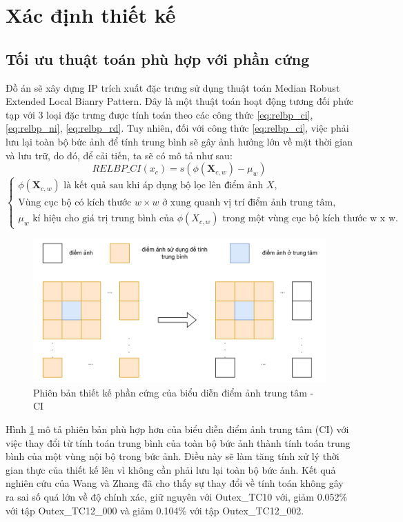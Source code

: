 \section{Xác định thiết kế}
\subsection{Tối ưu thuật toán phù hợp với phần cứng}
Đồ án sẽ xây dựng IP trích xuất đặc trưng sử dụng thuật toán Median Robust Extended Local Bianry Pattern. Đây là một thuật toán hoạt động tương đối phức tạp với 3 loại đặc trưng được tính toán theo các công thức \ref{eq:relbp_ci}, \ref{eq:relbp_ni}, \ref{eq:relbp_rd}. Tuy nhiên, đối với công thức \ref{eq:relbp_ci}, việc phải lưu lại toàn bộ bức ảnh để tính trung bình sẽ gây ảnh hưởng lớn về mặt thời gian và lưu trữ, do đó, để cải tiến, ta sẽ có mô tả như sau:
    \begin{equation}
        RELBP\_CI(x_c) = s(\phi(\mathbf{X}_{c, w}) - \mu_w)
         \label{eq:relbp_ci_op}
    \end{equation}
    $\begin{cases}
    \phi(\mathbf{X}_{c,w}) \text{ là kết quả sau khi áp dụng bộ lọc lên điểm ảnh } X, \\
    \text{Vùng cục bộ có kích thước } w \times w \text{ ở xung quanh vị trí điểm ảnh trung tâm}, \\
    \mu_w \text{ kí hiệu cho giá trị trung bình của } \phi(X_{c,w}) \text{ trong một vùng cục bộ kích thước w x w}.
\end{cases}$

\begin{figure} [!hht]
	\centering
	\includegraphics[width=\linewidth]{figures/ciOptimize.png}
	\caption{Phiên bản thiết kế phần cứng của biểu diễn điểm ảnh trung tâm - CI}
	\label{fig:ciOptimize}
\end{figure} 
Hình \ref{fig:ciOptimize} mô tả phiên bản phù hợp hơn của biểu diễn điểm ảnh trung tâm (CI) với việc thay đổi từ tính toán trung bình của toàn bộ bức ảnh thành tính toán trung bình của một vùng nội bộ trong bức ảnh. Điều này sẽ làm tăng tính xử lý thời gian thực của thiết kế lên vì không cần phải lưu lại toàn bộ bức ảnh. Kết quả nghiên cứu của Wang và Zhang \cite{realTimeTexture} đã cho thấy sự thay đổi về tính toán không gây ra sai số quá lớn về độ chính xác, giữ nguyên với Outex\_TC10 với, giảm 0.052\% với tập Outex\_TC12\_000 và giảm 0.104\% với tập Outex\_TC12\_002.

